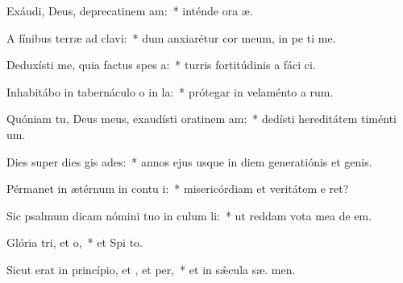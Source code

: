 \item Exáudi, Deus, deprecatinem am:~* inténde ora æ.
\item A fínibus terræ ad  clavi:~* dum anxiarétur cor meum, in pe ti me.
\item Deduxísti me, quia factus  spes a:~* turris fortitúdinis a fáci ci.
\item Inhabitábo in tabernáculo o in la:~* prótegar in velaménto a rum.
\item Quóniam tu, Deus meus, exaudísti oratinem am:~* dedísti hereditátem timénti  um.
\item Dies super dies gis ades:~* annos ejus usque in diem generatiónis et genis.
\item Pérmanet in ætérnum in contu i:~* misericórdiam et veritátem e  ret?
\item Sic psalmum dicam nómini tuo in culum li:~* ut reddam vota mea de   em.
\item Glória tri, et o,~* et Spi to.
\item Sicut erat in princípio, et , et per,~* et in sǽcula sæ. men.
